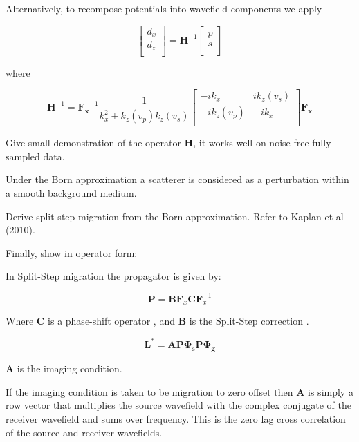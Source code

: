 Alternatively, to recompose potentials into wavefield components we apply

\begin{equation}
\begin{bmatrix}
	d_x\\
	d_z\\
\end{bmatrix}
=\mathbf{H}^{-1}
\begin{bmatrix}
	p\\
	s\\
\end{bmatrix}
\end{equation}

where
 
\begin{equation}
\mathbf{H}^{-1} = \mathbf{F_x}^{-1} \frac{1}{k_x^2 + k_z(v_p)k_z(v_s)}
\begin{bmatrix}
	-ik_x & ik_z(v_s)\\
	-ik_z(v_p) & -ik_x\\
\end{bmatrix}\mathbf{F_x}
\end{equation}

Give small demonstration of the operator $\mathbf{H}$, it works well on noise-free fully sampled data.



Under the Born approximation a scatterer is considered as a perturbation within a smooth background medium.  

Derive split step migration from the Born approximation. Refer to Kaplan et al (2010). 

Finally, show in operator form:

In Split-Step migration the propagator is given by:

\begin{equation}
\mathbf{P} = \mathbf{B}\mathbf{F}_x\mathbf{C}\mathbf{F}_x^{-1}
\end{equation}

Where $\mathbf{C}$ is a phase-shift operator \citep{gazdag1978wave}, and $\mathbf{B}$ is the Split-Step correction \citep{Stoffa01041990}. 

\begin{equation}
\mathbf{L}^* = \mathbf{A}\mathbf{P} \mathbf{\Phi_s}\mathbf{P} \mathbf{\Phi_g}
\end{equation}

$\mathbf{A}$ is the imaging condition.

If the imaging condition is taken to be migration to zero offset then $\mathbf{A}$ is simply a row vector that multiplies the source wavefield with the complex conjugate of the receiver wavefield and sums over frequency. This is the zero lag cross correlation of the source and receiver wavefields. 

